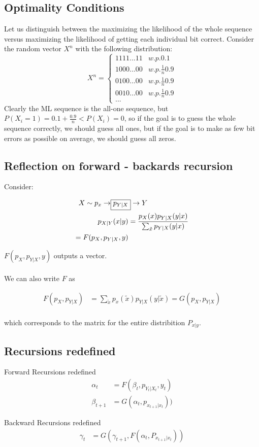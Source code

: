 \documentclass{article}
\begin{document}
\subsection{Optimality Conditions}
Let us distinguish between the maximizing the likelihood of the whole sequence versus maximizing the likelihood of getting each individual bit correct. 
Consider the random vector $X^n$ with the following distribution:
\[ X^n = \begin{cases} 
1111...11 & w.p.  0.1 \\
1000...00 & w.p.  \frac{1}{n}0.9 \\
0100...00 & w.p.  \frac{1}{n}0.9 \\
0010...00 & w.p.  \frac{1}{n}0.9 \\
...
\end{cases}
\]
Clearly the ML sequence is the all-one sequence, but 
$P(X_i=1)=0.1+\frac{0.9}{n}<P(X_i)=0$,
so if the goal is to guess the whole sequence correctly, we should guess all ones, but if the goal is to make as few bit errors as possible on average, we should guess all zeros.

\subsection{Reflection on forward - backards recursion}

Consider:

\begin{align*}
	X \sim p_x \rightarrow \Aboxed{p_{Y|X}} \rightarrow Y\\
	p_{X|Y}(x|y) &= \frac{p_X(x) p_{Y|X}(y|x)}{\sum_{\tilde{x}}^{} p_{Y|X}(y|x)}\\
	= F(p_X, p_{Y|X}, y) \\
\end{align*}

$F(p_X, p_{Y|X}, y)$ outputs a vector.
\\
\\
We can also write $F$ as

\begin{align*}
	F(p_{X}, p_{Y|X}) &= \sum_{\tilde{x}}^{} p_x(\tilde{x})p_{Y|X}(y|\tilde{x}) = G(p_X, p_{Y|X})\\
\end{align*}

which corresponds to the matrix for the entire distribition $P_{x|y}$.
\subsection{Recursions redefined}

Forward Recursions redefined
\begin{align}
	\alpha_t&= F(\beta_t, p_{Y_t|X_t}, y_t)\\
	\beta_{t+1} &= G(\alpha_t, p_{x_{t+1} | x_t}))
\end{align}

Backward Recursions redefined
\begin{align}
	\gamma_t &= G(\gamma_{t+1}, F(\alpha_t, P_{x_{t+1} | x_t}))
\end{align}
\end{document}
